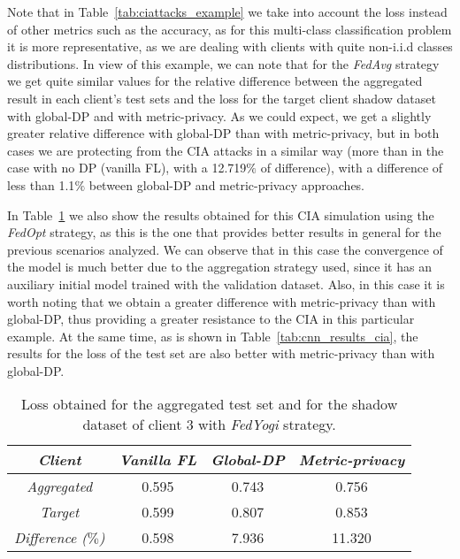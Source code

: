 \documentclass[5p,times]{elsarticle}
\begin{document}
Note that in Table~\ref{tab:ciattacks_example} we take into account the loss instead of other metrics such as the accuracy, as for this multi-class classification problem it is more representative, as we are dealing with clients with quite non-i.i.d classes distributions. In view of this example, we can note that for the \textit{FedAvg} strategy we get quite similar values for the relative difference between the aggregated result in each client's test sets and the loss for the target client shadow dataset with global-DP and with metric-privacy. As we could expect, we get a slightly greater relative difference with global-DP than with metric-privacy, but in both cases we are protecting from the CIA attacks in a similar way (more than in the case with no DP (vanilla FL), with a 12.719$\%$ of difference), with a difference of less than 1.1$\%$ between global-DP and metric-privacy approaches. 

In Table~\ref{tab:ciattacks_example_fedopt} we also show the results obtained for this CIA simulation using the \textit{FedOpt} strategy, as this is the one that provides better results in general for the previous scenarios analyzed. We can observe that in this case the convergence of the model is much better due to the aggregation strategy used, since it has an auxiliary initial model trained with the validation dataset. Also, in this case it is worth noting that we obtain a greater difference with metric-privacy than with global-DP, thus providing a greater resistance to the CIA in this particular example. At the same time, as is shown in Table~\ref{tab:cnn_results_cia}, the results for the loss of the test set are also better with metric-privacy than with global-DP. 

\begin{table}[ht]
    \centering
    \begin{tabular}{cccc}
    \toprule
         \textit{\textbf{Client}} & \textit{\textbf{Vanilla FL}} & \textit{\textbf{Global-DP}} & \textit{\textbf{Metric-privacy}} \\
         \midrule
         \textit{Aggregated} & 0.595 & 0.743 & 0.756 \\ 
         \textit{Target}  & 0.599 & 0.807 & 0.853 \\ 
         \midrule
         \textit{Difference ($\%$)} & 0.598 & 7.936 & 11.320 \\ 
    \bottomrule
    \end{tabular}
    \caption{Loss obtained for the aggregated test set and for the shadow dataset of client 3 with \textit{FedYogi} strategy.}
    \label{tab:ciattacks_example_fedopt}
\end{table}
\end{document}
